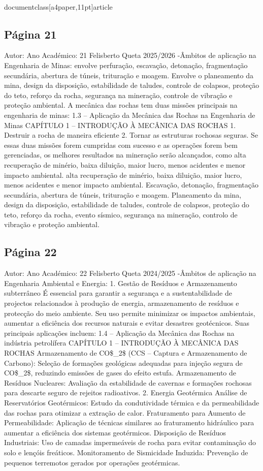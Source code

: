 \\documentclass[a4paper,11pt]{article}
\begin{document}
\subsection*{Página 21}
Autor:
Ano Académico:
21
Felisberto Queta
2025/2026
-Âmbitos de aplicação na Engenharia de Minas:
envolve perfuração, escavação, detonação, fragmentação secundária,
abertura de túneis, trituração e moagem.
Envolve o planeamento da mina, design da disposição, estabilidade de 
taludes, controle de colapsos, proteção do teto, reforço da rocha, 
segurança na mineração, controle de vibração e proteção ambiental.
A mecânica das rochas tem duas missões principais na engenharia de minas:
1.3 – Aplicação da Mecânica das Rochas na Engenharia de Minas
CAPÍTULO 1 – INTRODUÇÃO À MECÂNICA DAS ROCHAS
1. Destruir a rocha de maneira eficiente
2. Tornar as estruturas rochosas seguras.
Se essas duas missões forem cumpridas com sucesso e as operações forem bem gerenciadas, os melhores resultados na 
mineração serão alcançados, como alta recuperação de minério, baixa diluição, maior lucro, menos acidentes e menor 
impacto ambiental.
alta recuperação de 
minério, baixa 
diluição, maior lucro, 
menos acidentes e 
menor impacto 
ambiental.
Escavação, detonação, 
fragmentação 
secundária, abertura de 
túneis, trituração e 
moagem.
Planeamento da mina, 
design da disposição, 
estabilidade de taludes, 
controle de colapsos, 
proteção do teto, reforço 
da rocha, evento 
sísmico, segurança na 
mineração, controlo de 
vibração e proteção 
ambiental.



\subsection*{Página 22}
Autor:
Ano Académico:
22
Felisberto Queta
2024/2025
-Âmbitos de aplicação na Engenharia Ambiental e Energia:
1. Gestão de Resíduos e Armazenamento subterrâneo
É essencial para garantir a segurança e a sustentabilidade de projectos relacionados à produção de energia,
armazenamento de resíduos e protecção do meio ambiente. Seu uso permite minimizar os impactos ambientais, aumentar a
eficiência dos recursos naturais e evitar desastres geotécnicos. Suas principais aplicações incluem:
1.4 – Aplicação da Mecânica das Rochas na indústria petrolífera
CAPÍTULO 1 – INTRODUÇÃO À MECÂNICA DAS ROCHAS
Armazenamento de CO\$\_2\$ (CCS – Captura e Armazenamento de Carbono):
Seleção de formações geológicas adequadas para injeção segura de CO\$\_2\$, reduzindo emissões de gases do efeito estufa.
Armazenamento de Resíduos Nucleares:
Avaliação da estabilidade de cavernas e formações rochosas para descarte seguro de rejeitos radioativos.
2. Energia Geotérmica
Análise de Reservatórios Geotérmicos:
Estudo da condutividade térmica e da permeabilidade das rochas para otimizar a extração de calor.
Fraturamento para Aumento de Permeabilidade:
Aplicação de técnicas similares ao fraturamento hidráulico para aumentar a eficiência dos sistemas geotérmicos.
Disposição de Resíduos Industriais:
Uso de camadas impermeáveis de rocha para evitar contaminação do solo e lençóis freáticos.
Monitoramento de Sismicidade Induzida:
Prevenção de pequenos terremotos gerados por operações geotérmicas.
\end{document}
